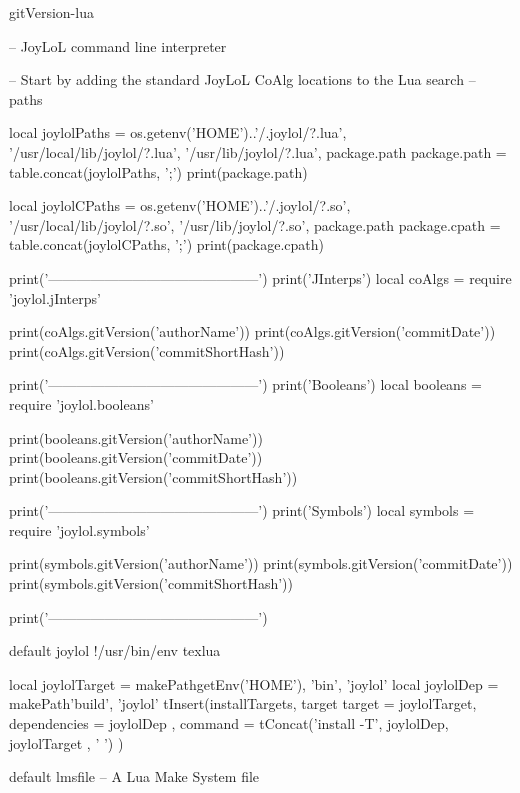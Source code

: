 
\startchapter[title=Preamble]


\component gitVersion-lua

\startLuaCode
-- JoyLoL command line interpreter 

-- Start by adding the standard JoyLoL CoAlg locations to the Lua search 
-- paths 

local joylolPaths = {
  os.getenv('HOME')..'/.joylol/?.lua',
  '/usr/local/lib/joylol/?.lua',
  '/usr/lib/joylol/?.lua',
  package.path
}
package.path = table.concat(joylolPaths, ';')
print(package.path)

local joylolCPaths = {
  os.getenv('HOME')..'/.joylol/?.so',
  '/usr/local/lib/joylol/?.so',
  '/usr/lib/joylol/?.so',
  package.path
}
package.cpath = table.concat(joylolCPaths, ';')
print(package.cpath)

print('---------------------------------------------')
print('JInterps')
local coAlgs = require 'joylol.jInterps'

print(coAlgs.gitVersion('authorName'))
print(coAlgs.gitVersion('commitDate'))
print(coAlgs.gitVersion('commitShortHash'))

print('---------------------------------------------')
print('Booleans')
local booleans = require 'joylol.booleans'

print(booleans.gitVersion('authorName'))
print(booleans.gitVersion('commitDate'))
print(booleans.gitVersion('commitShortHash'))

print('---------------------------------------------')
print('Symbols')
local symbols = require 'joylol.symbols'

print(symbols.gitVersion('authorName'))
print(symbols.gitVersion('commitDate'))
print(symbols.gitVersion('commitShortHash'))

print('---------------------------------------------')

\stopLuaCode


\createLuaCodeFile%
  {default}%
  {joylol}%
  {!/usr/bin/env texlua}



\startLmsfile
local joylolTarget = makePath{getEnv('HOME'), 'bin', 'joylol'}
local joylolDep    = makePath{'build', 'joylol'}
tInsert(installTargets, target{
  target       = joylolTarget,
  dependencies = { joylolDep },
  command      = tConcat({'install -T', joylolDep, joylolTarget }, ' ')
})
\stopLmsfile


\createLmsfileFile%
  {default}%
  {lmsfile}%
  {-- A Lua Make System file}

\stopchapter
